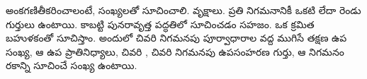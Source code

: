 \documentclass[../../../include/open-logic-section]{subfiles}
\begin{document}

\begin{explain}
 అంకగణితీకరించాలంటే,
 సంఖ్యలతో సూచించాలి.
 
వృక్షాలు. ప్రతి నిగమనానికీ ఒకటి లేదా రెండు గుర్తులు ఉంటాయి. కాబట్టి
పునరావృత్త పద్ధతిలో సూచించడం సహజం. ఒక 
క్రమిత బహుళకంతో సూచిస్తాం. అందులో చివరి నిగమనపు పూర్వాధారాల వద్ద ముగిసే
తక్షణ ఉప సంఖ్య, ఆ
ఉప ప్రాతినిధ్యాలు, చివరి
, చివరి నిగమనపు ఉపసంహరణ గుర్తు, ఆ నిగమనం
రకాన్ని సూచించే సంఖ్య ఉంటాయి.
\end{explain}
\end{document}
